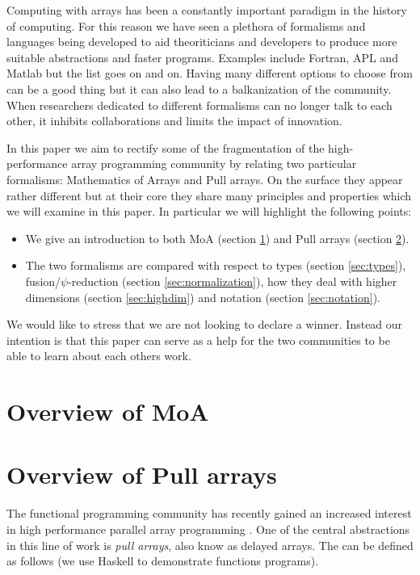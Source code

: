 \documentclass[preprint]{sigplanconf}
\begin{document}
Computing with arrays has been a constantly important paradigm in the
history of computing. For this reason we have seen a plethora of
formalisms and languages being developed to aid theoriticians and
developers to produce more suitable abstractions and faster programs.
Examples include Fortran, APL and Matlab but the list goes on and on.
Having many different options to choose from can be a good thing but
it can also lead to a balkanization of the community. When researchers
dedicated to different formalisms can no longer talk to each other,  it
inhibits collaborations and limits the impact of innovation.

In this paper we aim to rectify some of the fragmentation of the
high-performance array programming community by relating two
particular formalisms: Mathematics of Arrays and Pull arrays. On the
surface they appear rather different but at their core they share many
principles and properties which we will examine in this paper. In
particular we will highlight the following points:
\begin{itemize}
\item We give an introduction to both MoA (section \ref{sec:moa}) and Pull
  arrays (section \ref{sec:pull}).
\item The two formalisms are compared with respect to types (section
  \ref{sec:types}), fusion/\(\psi\)-reduction (section
  \ref{sec:normalization}), 
  how they deal with higher dimensions (section \ref{sec:highdim})
  and notation (section \ref{sec:notation}).
\end{itemize}

We would like to stress that we are not looking to declare a
winner. Instead our intention is that this paper can serve as a help
for the two communities to be able to learn about each others work.

\section{Overview of MoA}
\label{sec:moa}

\section{Overview of Pull arrays}
\label{sec:pull}

The functional programming community has recently gained an increased
interest in high performance parallel array programming
\cite{keller2010regular,Axelsson:2010:Feldspar,Mainland:2010:Nikola,Svensson:2011:Obsidian,Claessen:2012:Expressive,Ankner:2013:AnEDSL,lippmeier2011efficient}. One
of the central abstractions in this line of work is \emph{pull
 arrays}, also know as delayed arrays. The can be defined as follows
(we use Haskell \cite{marlow2010haskell} to demonstrate functions
programs).
\end{document}
